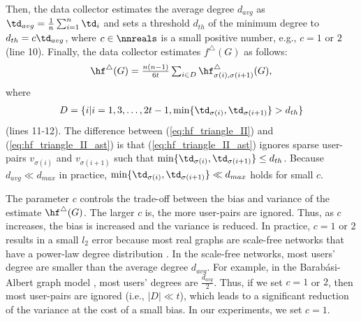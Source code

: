 Then, the data collector estimates the average degree $d_{avg}$ as $\td_{avg} = \frac{1}{n}\sum_{i=1}^n \td_i$ and sets a threshold $d_{th}$ of the minimum degree to $d_{th} = c \td_{avg}$, where $c \in \nnreals$ is a small positive number, e.g., $c=1$ or $2$ (line 10). 
Finally, the data collector estimates $f^\triangle(G)$ as follows: 
\begin{align}
    \hf^\triangle(G) = \textstyle{\frac{n(n-1)}{6t} \sum_{i \in D} \hf_{\sigma(i),\sigma(i+1)}^\triangle(G)}, 
   \label{eq:hf_triangle_II_ast}
\end{align}
where 
\begin{align*}
D = \{i | i = 1, 3, \ldots, 2t-1, 
  \min\{\td_{\sigma(i)}, \td_{\sigma(i+1)}\} > d_{th}\}
\end{align*}
(lines 11-12). 
The difference between (\ref{eq:hf_triangle_II}) and (\ref{eq:hf_triangle_II_ast}) is that (\ref{eq:hf_triangle_II_ast}) ignores sparse user-pairs $v_{\sigma(i)}$ and $v_{\sigma(i+1)}$ such that $\min\{\td_{\sigma(i)}, \td_{\sigma(i+1)}\} \leq d_{th}$. 
Because $d_{avg} \ll d_{max}$ in practice,  
$\min\{\td_{\sigma(i)}, \td_{\sigma(i+1)}\} \ll d_{max}$ holds for small $c$. 

The parameter $c$ controls the trade-off between the bias and variance of the estimate $\hf^\triangle(G)$. 
The larger $c$ is, the more user-pairs are ignored. 
Thus, as $c$ increases, the bias is increased and the variance is reduced. 
In practice, $c=1$ or $2$ results in a small $l_2$ error %
because most real graphs are scale-free networks that have a power-law degree distribution \cite{NetworkScience}. 
In the scale-free networks, most users' degree are smaller than the average degree $d_{avg}$. 
For example, in the Barab\'{a}si-Albert graph model \cite{NetworkScience,Hagberg_SciPy08}, 
most users' degrees are $\frac{d_{avg}}{2}$. 
Thus, if we set 
$c=1$ or $2$, 
then most user-pairs are ignored (i.e., $|D| \ll t$), which leads to a significant reduction of the variance at the cost of a small bias. 
In our experiments, we set $c=1$. 

